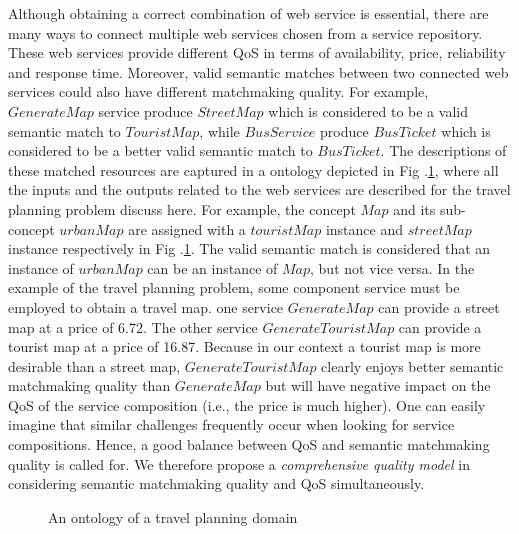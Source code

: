 Although obtaining a correct combination of web service is essential, there are many ways to connect multiple web services chosen from a service repository. These web services provide different QoS in terms of availability, price, reliability and response time. Moreover, valid semantic matches between two connected web services could also have different matchmaking quality. For example, $Generate Map$ service produce $StreetMap$ which is considered to be a valid semantic match to $TouristMap$, while $Bus Service$ produce $BusTicket$ which is considered to be a better valid semantic match to $BusTicket$. The descriptions of these matched resources are captured in a ontology depicted in Fig .\ref{taxonomy}, where all the inputs and the outputs related to the web services are described for the travel planning problem discuss here. For example, the concept $Map$ and its sub-concept $urbanMap$ are assigned with a $touristMap$ instance and $streetMap$ instance respectively in Fig .\ref{taxonomy}. The valid semantic match is considered that an instance of $urban Map$ can be an instance of $Map$, but not vice versa. In the example of the travel planning problem, some component service must be employed to obtain a travel map. one service $GenerateMap$ can provide a street map at a price of 6.72. The other service $GenerateTouristMap$ can provide a tourist map at a price of 16.87. Because in our context a tourist map is more desirable than a street map, $GenerateTouristMap$ clearly enjoys better semantic matchmaking quality than $GenerateMap$ but will have negative impact on the QoS of the service composition (i.e., the price is much higher). One can easily imagine that similar challenges frequently occur when looking for service compositions. Hence, a good balance between QoS and semantic matchmaking quality is called for. We therefore propose a \emph{comprehensive quality model} in considering semantic matchmaking quality and QoS simultaneously.



\begin{figure}[h]
\centering
{}
 \caption{ An ontology of a travel planning domain}
 \label{taxonomy}
\end{figure}



